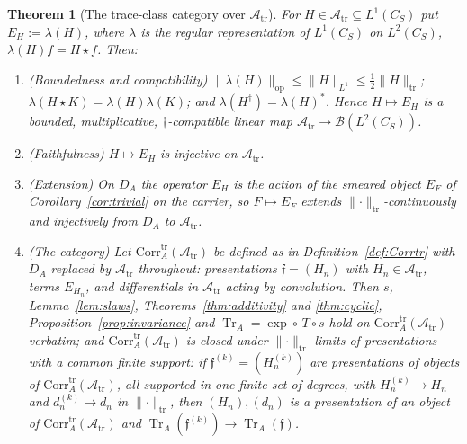 \documentclass[11pt]{amsart}
\newtheorem{theorem}{Theorem}[section]
\theoremstyle{definition}
\theoremstyle{remark}
\newcommand{\Tr}{\operatorname{Tr}}
\newcommand{\DA}{D_A}
\newcommand{\Atr}{\mathcal A_{\mathrm{tr}}}
\newcommand{\Corrtr}{\mathrm{Corr}^{\mathrm{tr}}_{A}}
\begin{document}
\begin{theorem}[The trace-class category over $\Atr$]\label{thm:Atrcat}
For $H\in\Atr\subseteq L^{1}(C_S)$ put $E_H:=\lambda(H)$, where $\lambda$ is
the regular representation of $L^{1}(C_S)$ on $L^{2}(C_S)$, $\lambda(H)f=H\star
f$.  Then:
\begin{enumerate}
\item[(a)] \emph{(Boundedness and compatibility)}
$\lVert\lambda(H)\rVert_{\mathrm{op}}\le\lVert H\rVert_{L^{1}}\le
\tfrac12\lVert H\rVert_{\mathrm{tr}}$; $\lambda(H\star K)=\lambda(H)\lambda(K)$;
and $\lambda(H^{\dagger})=\lambda(H)^{*}$.  Hence $H\mapsto E_H$ is a bounded,
multiplicative, $\dagger$-compatible linear map $\Atr\to
\mathcal B(L^{2}(C_S))$.
\item[(b)] \emph{(Faithfulness)}  $H\mapsto E_H$ is injective on $\Atr$.
\item[(c)] \emph{(Extension)}  On $\DA$ the operator $E_H$ is the action of the
smeared object $E_F$ of Corollary~\ref{cor:trivial} on the carrier, so
$F\mapsto E_F$ extends $\lVert\cdot\rVert_{\mathrm{tr}}$-continuously and
injectively from $\DA$ to $\Atr$.
\item[(d)] \emph{(The category)}  Let $\Corrtr(\Atr)$ be defined as in
Definition~\ref{def:Corrtr} with $\DA$ replaced by $\Atr$ throughout:
presentations $\mathfrak f=(H_n)$ with $H_n\in\Atr$, terms $E_{H_n}$, and
differentials in $\Atr$ acting by convolution.  Then $s$,
Lemma~\ref{lem:slaws}, Theorems~\ref{thm:additivity} and \ref{thm:cyclic},
Proposition~\ref{prop:invariance} and $\Tr_A=\exp\circ\,T\circ s$ hold on
$\Corrtr(\Atr)$ verbatim; and $\Corrtr(\Atr)$ is closed under
$\lVert\cdot\rVert_{\mathrm{tr}}$-limits of presentations with a common finite
support: if $\mathfrak f^{(k)}=(H^{(k)}_n)$ are presentations of objects of
$\Corrtr(\Atr)$, all supported in one finite set of degrees, with
$H^{(k)}_n\to H_n$ and $d^{(k)}_n\to d_n$ in
$\lVert\cdot\rVert_{\mathrm{tr}}$, then $(H_n),(d_n)$ is a presentation of an
object of $\Corrtr(\Atr)$ and
$\Tr_A(\mathfrak f^{(k)})\to\Tr_A(\mathfrak f)$.
\end{enumerate}
\end{theorem}
\end{document}
